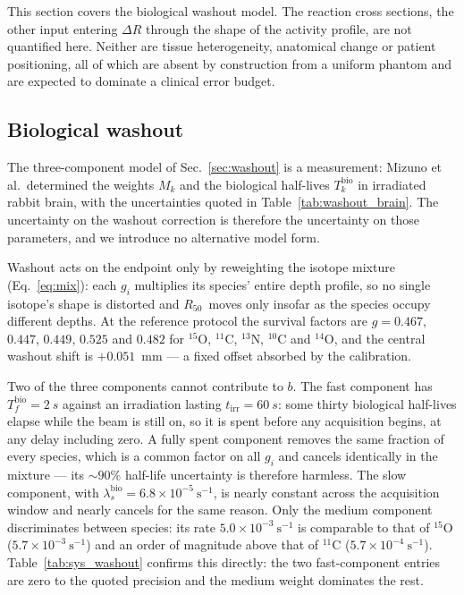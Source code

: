 \documentclass[11pt]{article}
\newcommand{\Rc}{\ensuremath{R_{50}}}
\newcommand{\DR}{\ensuremath{\Delta R}}
\begin{document}
This section covers the biological washout model. The reaction cross sections,
the other input entering $\DR$ through the shape of the activity profile, are
not quantified here. Neither are tissue heterogeneity, anatomical change or
patient positioning, all of which are absent by construction from a uniform
phantom and are expected to dominate a clinical error budget.

\subsection{Biological washout}
\label{sec:sys-washout}

The three-component model of Sec.~\ref{sec:washout} is a measurement: Mizuno et
al.\ determined the weights $M_k$ and the biological half-lives
$T_k^{\mathrm{bio}}$ in irradiated rabbit brain, with the uncertainties quoted in
Table~\ref{tab:washout_brain}. The uncertainty on the washout correction is
therefore the uncertainty on those parameters, and we introduce no alternative
model form.

Washout acts on the endpoint only by reweighting the isotope mixture
(Eq.~\ref{eq:mix}): each $g_i$ multiplies its species' entire depth profile, so
no single isotope's shape is distorted and \Rc\ moves only insofar as the species
occupy different depths. At the reference protocol the survival factors are
$g = 0.467$, $0.447$, $0.449$, $0.525$ and $0.482$ for $^{15}$O, $^{11}$C,
$^{13}$N, $^{10}$C and $^{14}$O, and the central washout shift is
$+0.051$~mm --- a fixed offset absorbed by the calibration.

Two of the three components cannot contribute to $b$. The fast component has
$T_f^{\mathrm{bio}} = \SI{2}{s}$ against an irradiation lasting
$t_{\mathrm{irr}} = \SI{60}{s}$: some thirty biological half-lives elapse while
the beam is still on, so it is spent before any acquisition begins, at any delay
including zero. A fully spent component removes the same fraction of every
species, which is a common factor on all $g_i$ and cancels identically in the
mixture --- its $\sim\!90\%$ half-life uncertainty is therefore harmless. The
slow component, with $\lambda_s^{\mathrm{bio}} = 6.8\times10^{-5}~\mathrm{s}^{-1}$,
is nearly constant across the acquisition window and nearly cancels for the same
reason. Only the medium component discriminates between species: its rate
$5.0\times10^{-3}~\mathrm{s}^{-1}$ is comparable to that of $^{15}$O
($5.7\times10^{-3}~\mathrm{s}^{-1}$) and an order of magnitude above that of
$^{11}$C ($5.7\times10^{-4}~\mathrm{s}^{-1}$). Table~\ref{tab:sys_washout}
confirms this directly: the two fast-component entries are zero to the quoted
precision and the medium weight dominates the rest.
\end{document}
